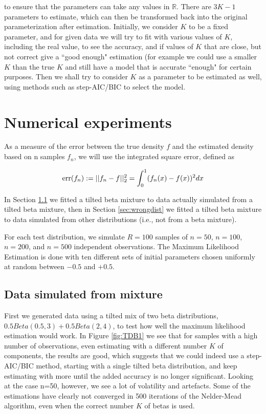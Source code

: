 \documentclass[10pt]{report}
\begin{document}
\noindent
to ensure that the parameters can take any values in $\mathbb{R}$. There are $3K-1$ parameters to estimate, which can then be transformed back into the original parameterization after estimation. Initially, we consider $K$ to be a fixed parameter, and for given data we will try to fit with various values of $K$, including the real value, to see the accuracy, and if values of $K$ that are close, but not correct give a ``good enough" estimation (for example we could use a smaller $K$ than the true $K$ and still have a model that is accurate ``enough" for certain purposes. Then we shall try to consider $K$ as a parameter to be estimated as well, using methods such as step-AIC/BIC to select the model.

\section{Numerical experiments}



As a measure of the error between the true density $f$ and the estimated density based on n samples $f_n$, we will use the integrated square error, defined as

$$
{\rm err}(f_n) := ||f_n - f||^2_2 = \int_0^1(f_n(x)-f(x))^2dx
$$

In Section \ref{sec:truedist} we fitted a tilted beta mixture to data actually simulated from a tilted beta mixture, then in Section \ref{sec:wrongdist} we fitted a tilted beta mixture to data simulated from other distributions (i.e., not from a beta mixture).

For each test distribution, we simulate $R=100$ samples of $n=50$, $n=100$, $n=200$, and $n=500$ independent observations. The Maximum Likelihood Estimation is done with ten different sets of initial parameters chosen uniformly at random between $-0.5$ and $+0.5$.

\subsection{Data simulated from mixture}
\label{sec:truedist}

First we generated data using a tilted mix of two beta distributions, $0.5Beta(0.5,3) + 0.5Beta(2,4)$, to test how well the maximum likelihood estimation would work. In Figure \ref{fig:TDB1} we see that for samples with a high number of observations, even estimating with a different number $K$ of components, the results are good, which suggests that we could indeed use a step-AIC/BIC method, starting with a single tilted beta distribution, and keep estimating with more until the added accuracy is no longer significant. Looking at the case n=50, however, we see a lot of volatility and artefacts. Some of the estimations have clearly not converged in 500 iterations of the Nelder-Mead algorithm, even when the correct number $K$ of betas is used.
\\
\end{document}
